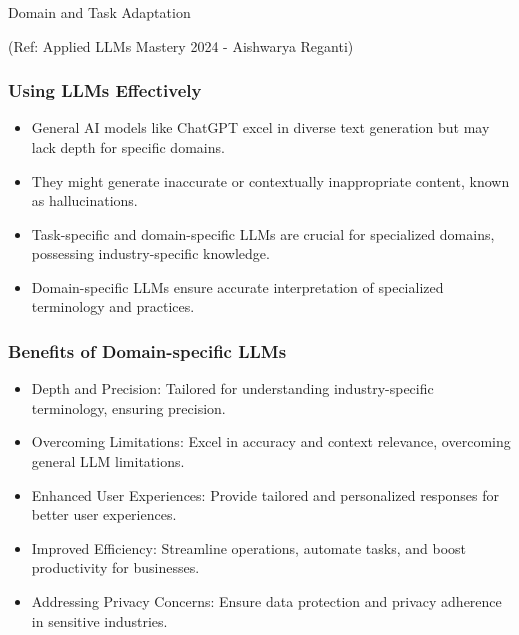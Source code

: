\begin{frame}[fragile]\frametitle{}
\begin{center}
{\Large Domain and Task Adaptation}

{\tiny (Ref: Applied LLMs Mastery 2024 - Aishwarya Reganti)}

\end{center}


\end{frame}

\begin{frame}[fragile]\frametitle{Using LLMs Effectively}
  \begin{itemize}
    \item General AI models like ChatGPT excel in diverse text generation but may lack depth for specific domains.
    \item They might generate inaccurate or contextually inappropriate content, known as hallucinations.
    \item Task-specific and domain-specific LLMs are crucial for specialized domains, possessing industry-specific knowledge.
    \item Domain-specific LLMs ensure accurate interpretation of specialized terminology and practices.
 
  \end{itemize}
\end{frame}

\begin{frame}[fragile]\frametitle{Benefits of Domain-specific LLMs}
  \begin{itemize}
	\item Depth and Precision: Tailored for understanding industry-specific terminology, ensuring precision.
	\item Overcoming Limitations: Excel in accuracy and context relevance, overcoming general LLM limitations.
	\item Enhanced User Experiences: Provide tailored and personalized responses for better user experiences.
	\item Improved Efficiency: Streamline operations, automate tasks, and boost productivity for businesses.
	\item Addressing Privacy Concerns: Ensure data protection and privacy adherence in sensitive industries.
  \end{itemize}
\end{frame}


